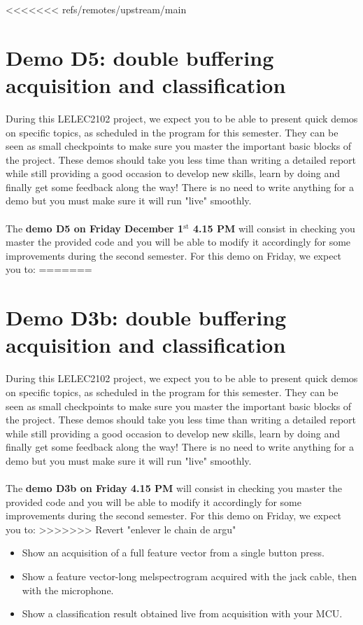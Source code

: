 <<<<<<< refs/remotes/upstream/main
\section{Demo D5: double buffering acquisition and classification}
%
During this LELEC2102 project, we expect you to be able to present quick demos on specific topics, as scheduled in the program for this semester. They can be seen as small checkpoints to make sure you master the important basic blocks of the project. These demos should take you less time than writing a detailed report while still providing a good occasion to develop new skills, learn by doing and finally get some feedback along the way! There is no need to write anything for a demo but you must make sure it will run "live" smoothly. \\
\\
The \textbf{demo D5 on Friday December 1$^{\text{st}}$ 4.15 PM} will consist in checking you master the provided code and you will be able to modify it accordingly for some improvements during the second semester. For this demo on Friday, we expect you to:
=======
\section{Demo D3b: double buffering acquisition and classification}
%
During this LELEC2102 project, we expect you to be able to present quick demos on specific topics, as scheduled in the program for this semester. They can be seen as small checkpoints to make sure you master the important basic blocks of the project. These demos should take you less time than writing a detailed report while still providing a good occasion to develop new skills, learn by doing and finally get some feedback along the way! There is no need to write anything for a demo but you must make sure it will run "live" smoothly. \\
\\
The \textbf{demo D3b on Friday 4.15 PM} will consist in checking you master the provided code and you will be able to modify it accordingly for some improvements during the second semester. For this demo on Friday, we expect you to:
>>>>>>> Revert "enlever le chain de argu"
%
\begin{itemize}
    \item Show an acquisition of a full feature vector from a single button press.
    \item Show a feature vector-long melspectrogram acquired with the jack cable, then with the microphone.
    \item Show a classification result obtained live from acquisition with your MCU.
\end{itemize}
